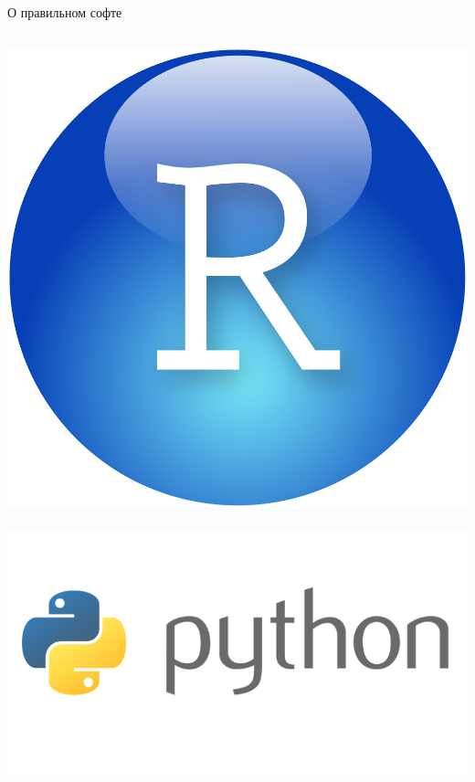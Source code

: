 \documentclass[aspectratio=169,newPxFont]{beamer}
\begin{document}
\begin{frame}{О правильном софте}
\begin{columns}
\begin{column}{.48\linewidth}
\centering
\includegraphics[width=0.4\linewidth]{RStudio-Ball.png}\\
\mbox{ } \\
\includegraphics[width=0.9\linewidth]{Python-logo.png}\\
\end{column}



\end{columns}
\end{frame}
\end{document}
